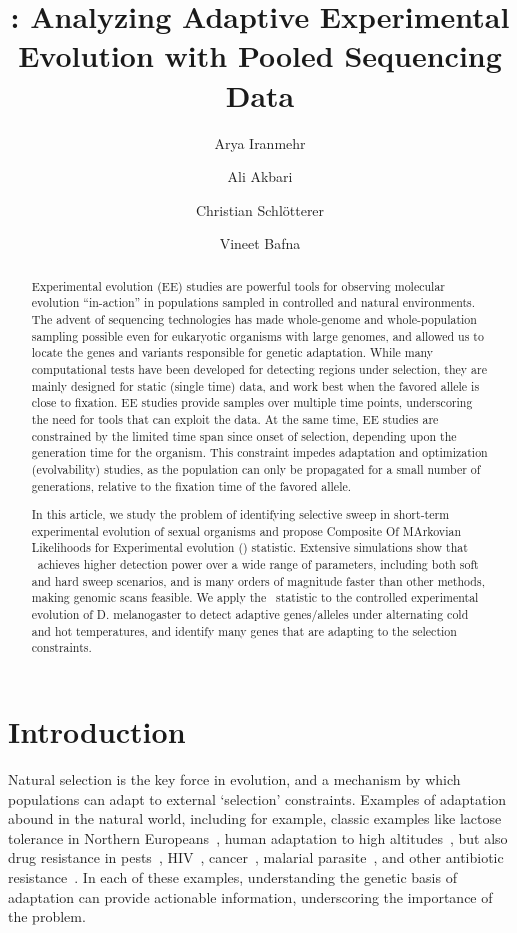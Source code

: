 \documentclass[11pt]{article}
\title{\comale: Analyzing Adaptive Experimental Evolution with Pooled Sequencing Data}
\author[1]{Arya Iranmehr}
\author[1]{Ali Akbari}
\author[2]{Christian Schl\"{o}tterer}
\author[3]{Vineet Bafna}
\affil[1]{\footnotesize Electrical and Computer Engineering, University of California, San Diego, La Jolla, CA 92093, USA.}
\affil[2]{\footnotesize Institut f\"{u}r Populationsgenetik, Vetmeduni, Vienna, Austria.}
\affil[3]{\footnotesize Computer Science \& Engineering, University of California, San Diego, La Jolla, CA 92093, USA}
\date{}
\def\comale{\text{{\sc Comale}}}
\begin{document}
\maketitle
\begin{abstract}
  Experimental evolution (EE) studies are powerful tools for observing
  molecular evolution ``in-action'' in populations sampled in
  controlled and natural environments. The advent of sequencing
  technologies has made whole-genome and whole-population sampling
  possible even for eukaryotic organisms with large genomes, and
  allowed us to locate the genes and variants responsible for genetic
  adaptation. While many computational tests have been developed for
  detecting regions under selection, they are mainly designed for
  static (single time) data, and work best when the favored allele is
  close to fixation. EE studies provide samples over multiple time
  points, underscoring the need for tools that can exploit the
  data. At the same time, EE studies are constrained by the limited
  time span since onset of selection, depending upon the generation
  time for the organism. This constraint impedes adaptation and
  optimization (evolvability) studies, as the population can only be
  propagated for a small number of generations, relative to the
  fixation time of the favored allele.  

  In this article, we study the problem of identifying selective sweep
  in short-term experimental evolution of sexual organisms and propose
  Composite Of MArkovian Likelihoods for Experimental evolution
  (\comale) statistic. Extensive simulations show that \comale\
  achieves higher detection power over a wide range of parameters,
  including both soft and hard sweep scenarios, and is many orders of
  magnitude faster than other methods, making genomic scans feasible.
  We apply the \comale\ statistic to the controlled experimental
  evolution of D. melanogaster to detect adaptive genes/alleles under
  alternating cold and hot temperatures, and identify many genes that
  are adapting to the selection constraints.
  \end{abstract}



\section{Introduction}
Natural selection is the key force in evolution, and a mechanism by
which populations can adapt to external `selection'
constraints. Examples of adaptation abound in the natural world,
including for example, classic examples like lactose tolerance in
Northern Europeans~\cite{bersaglieri2004genetic}, human adaptation to high
altitudes~\cite{yi2010sequencing,simonson2010genetic}, but also drug resistance 
in
pests~\cite{daborn2001ddt}, HIV~\cite{Feder2016More},
cancer~\cite{gottesman2002mechanisms,zahreddine2013mechanisms},
malarial parasite~\cite{ariey2014molecular,nair2007recurrent}, and
other antibiotic resistance~\cite{spellberg2008epidemic}. In each of
these examples, understanding the genetic basis of adaptation can
provide actionable information, underscoring the importance of the
problem.
\end{document}

